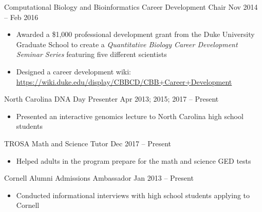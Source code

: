 

\begin{resentries}

  \leadershipentry
    {Computational Biology and Bioinformatics Career Development Chair} %
    {Nov 2014 -- Feb 2016} %
     {
      \begin{itemize}[leftmargin=*, itemsep=-1.5mm]
			\item{Awarded a \$1,000 professional development grant from the Duke University Graduate School to create a \textit{Quantitative Biology Career Development Seminar Series} featuring five different scientists}
        	\item{Designed a career development wiki: \href{https://wiki.duke.edu/display/CBBCD/CBB+Career+Development}{\color{blue} https://wiki.duke.edu/display/CBBCD/CBB+Career+Development}}
	  \end{itemize}
	 }

  \leadershipentry
    {North Carolina DNA Day Presenter}
    {Apr 2013; 2015; 2017 -- Present} %
     {
      \begin{itemize}[leftmargin=*, itemsep=-1.5mm]
			\item{Presented an interactive genomics lecture to North Carolina high school students}
	  \end{itemize}
	 }

  \leadershipentry
    {TROSA Math and Science Tutor}
    {Dec 2017 -- Present} %
     {
      \begin{itemize}[leftmargin=*, itemsep=-1.5mm]
			\item{Helped adults in the program prepare for the math and science GED tests}
		\end{itemize}
	 }

  \leadershipentry
    {Cornell Alumni Admissions Ambassador}
    {Jan 2013 -- Present} %
     {
		\begin{itemize}[leftmargin=*, itemsep=-1.5mm]
			\item{Conducted informational interviews with high school students applying to Cornell}
		\end{itemize}
	 }



\end{resentries}
